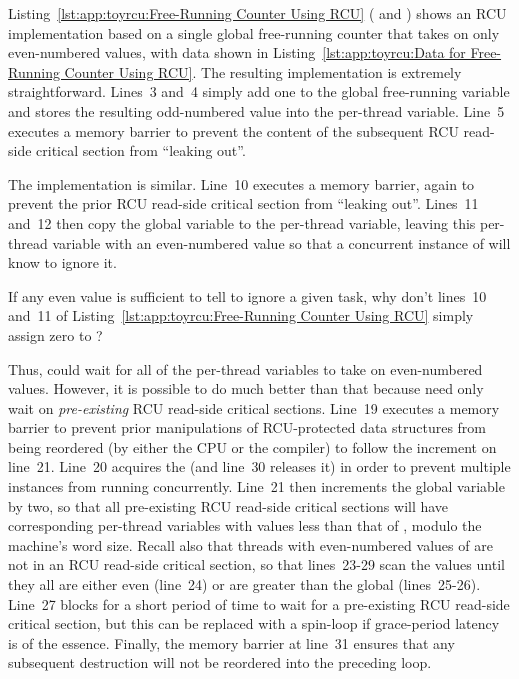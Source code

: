 Listing~\ref{lst:app:toyrcu:Free-Running Counter Using RCU}
( and )
shows an RCU implementation based on a single global free-running counter
that takes on only even-numbered values, with data shown in
Listing~\ref{lst:app:toyrcu:Data for Free-Running Counter Using RCU}.
The resulting  implementation is extremely
straightforward.
Lines~3 and~4 simply add one to the global free-running 
variable and stores the resulting odd-numbered value into the
 per-thread variable.
Line~5 executes a memory barrier to prevent the content of the
subsequent RCU read-side critical section from ``leaking out''.

The  implementation is similar.
Line~10 executes a memory barrier, again to prevent the prior RCU
read-side critical section from ``leaking out''.
Lines~11 and~12 then copy the  global variable to the
 per-thread variable, leaving this per-thread
variable with an even-numbered value so that a concurrent instance
of  will know to ignore it.

\QuickQuiz{}
	If any even value is sufficient to tell 
	to ignore a given task, why don't lines~10 and~11 of
	Listing~\ref{lst:app:toyrcu:Free-Running Counter Using RCU}
	simply assign zero to ?
 \QuickQuizEnd

Thus,  could wait for all of the per-thread
 variables to take on even-numbered values.
However, it is possible to do much better than that because
 need only wait on \emph{pre-existing}
RCU read-side critical sections.
Line~19 executes a memory barrier to prevent prior manipulations
of RCU-protected data structures from being reordered (by either
the CPU or the compiler) to follow the increment on line~21.
Line~20 acquires the  (and line~30 releases it)
in order to prevent multiple
 instances from running concurrently.
Line~21 then increments the global  variable by
two, so that all pre-existing RCU read-side critical sections will
have corresponding per-thread  variables with
values less than that of , modulo the machine's
word size.
Recall also that threads with even-numbered values of 
are not in an RCU read-side critical section,
so that lines~23-29 scan the  values until they
all are either even (line~24) or are greater than the global
 (lines~25-26).
Line~27 blocks for a short period of time to wait for a
pre-existing RCU read-side critical section, but this can be replaced with
a spin-loop if grace-period latency is of the essence.
Finally, the memory barrier at line~31 ensures that any subsequent
destruction will not be reordered into the preceding loop.

